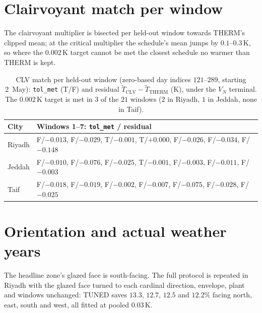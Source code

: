 \documentclass[11pt]{article}
\begin{document}
\section{Clairvoyant match per window}
\label{sec:s-clv}

The clairvoyant multiplier is bisected per held-out window towards THERM's clipped mean; at the critical multiplier the schedule's mean jumps by $0.1$--$0.3\,$K, so where the $0.002\,$K target cannot be met the closest schedule no warmer than THERM is kept.

\begin{table}[!ht]
\centering
\caption{CLV match per held-out window (zero-based day indices $121$--$289$,
starting 2~May):
\texttt{tol\_met} (T/F) and residual $\tilde T_{\mathrm{CLV}}-\tilde T_{\mathrm{THERM}}$
(K), under the $V_N$ terminal. The $0.002\,$K target is met in $3$ of the
$21$ windows ($2$ in Riyadh, $1$ in Jeddah, none in Taif).}
\label{tab:s-clv}
\small
\begin{tabularx}{\textwidth}{@{}lX@{}}
\toprule
City & Windows 1--7: \texttt{tol\_met} / residual \\
\midrule
Riyadh & F/$-0.013$, F/$-0.029$, T/$-0.001$, T/$+0.000$, F/$-0.026$, F/$-0.034$, F/$-0.148$ \\
Jeddah & F/$-0.010$, F/$-0.076$, F/$-0.025$, T/$-0.001$, F/$-0.003$, F/$-0.011$, F/$-0.003$ \\
Taif & F/$-0.018$, F/$-0.019$, F/$-0.002$, F/$-0.007$, F/$-0.075$, F/$-0.028$, F/$-0.025$ \\
\bottomrule
\end{tabularx}
\end{table}

\section{Orientation and actual weather years}
\label{sec:s-amy}

The headline zone's glazed face is south-facing. The full protocol is repeated in Riyadh with the glazed face turned to each cardinal direction, envelope, plant and windows unchanged: TUNED saves $13.3$, $12.7$, $12.5$ and $12.2\%$ facing north, east, south and west, all fitted at pooled $0.03\,$K.
\end{document}

